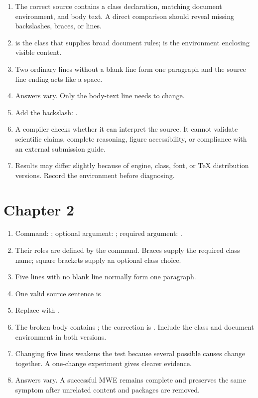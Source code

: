 \begin{enumerate}[label=1.\arabic*,leftmargin=2.4em,itemsep=0.55em]
  \item The correct source contains a class declaration, matching document
        environment, and body text. A direct comparison should reveal missing
        backslashes, braces, or lines.
  \item {} is the class that supplies broad document rules;
         is the environment enclosing visible content.
  \item Two ordinary lines without a blank line form one paragraph and the
        source line ending acts like a space.
  \item Answers vary. Only the body-text line needs to change.
  \item Add the backslash: .
  \item A compiler checks whether it can interpret the source. It cannot
        validate scientific claims, complete reasoning, figure accessibility,
        or compliance with an external submission guide.
  \item Results may differ slightly because of engine, class, font, or TeX
        distribution versions. Record the environment before diagnosing.
\end{enumerate}

\section*{Chapter 2}

\begin{enumerate}[label=2.\arabic*,leftmargin=2.4em,itemsep=0.55em]
  \item Command: ; optional argument: \optional{12pt};
        required argument: .
  \item Their roles are defined by the command. Braces supply the required
        class name; square brackets supply an optional class choice.
  \item Five lines with no blank line normally form one paragraph.
  \item One valid source sentence is
  \item Replace  with
        .
  \item The broken body contains ; the
        correction is . Include the
        class and document environment in both versions.
  \item Changing five lines weakens the test because several possible causes
        change together. A one-change experiment gives clearer evidence.
  \item Answers vary. A successful MWE remains complete and preserves the same
        symptom after unrelated content and packages are removed.
\end{enumerate}

